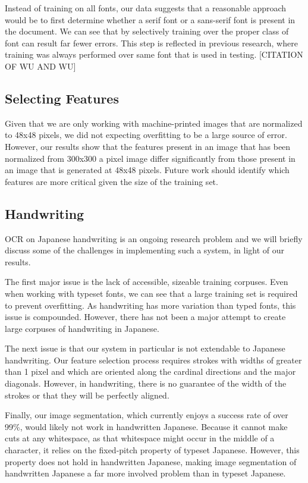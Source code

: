 \documentclass[10pt,twocolumn,letterpaper]{article}
\begin{document}
Instead of training on all fonts, our data suggests that a reasonable approach would be to first determine whether a serif font or a sans-serif font is present in the document. We can see that by selectively training over the proper class of font can result far fewer errors. This step is reflected in previous research, where training was always performed over same font that is used in testing. [CITATION OF WU AND WU]

\subsection{Selecting Features}
Given that we are only working with machine-printed images that are normalized to 48x48 pixels, we did not expecting overfitting to be a large source of error. However, our results show that the features present in an image that has been normalized from 300x300 a pixel image differ significantly from those present in an image that is generated at 48x48 pixels. Future work should identify which features are more critical given the size of the training set.


\subsection{Handwriting}

OCR on Japanese handwriting is an ongoing research problem and we will briefly discuss some of the challenges in implementing such a system, in light of our results.

The first major issue is the lack of accessible, sizeable training corpuses. Even when working with typeset fonts, we can see that a large training set is required to prevent overfitting. As handwriting has more variation than typed fonts, this issue is compounded. However, there has not been a major attempt to create large corpuses of handwriting in Japanese.

The next issue is that our system in particular is not extendable to Japanese handwriting. Our feature selection process requires strokes with widths of greater than 1 pixel and which are oriented along the cardinal directions and the major diagonals. However, in handwriting, there is no guarantee of the width of the strokes or that they will be perfectly aligned.

Finally, our image segmentation, which currently enjoys a success rate of over 99\%, would likely not work in handwritten Japanese. Because it cannot make cuts at any whitespace, as that whitespace might occur in the middle of a character, it relies on the fixed-pitch property of typeset Japanese. However, this property does not hold in handwritten Japanese, making image segmentation of handwritten Japanese a far more involved problem than in typeset Japanese.
\end{document}
